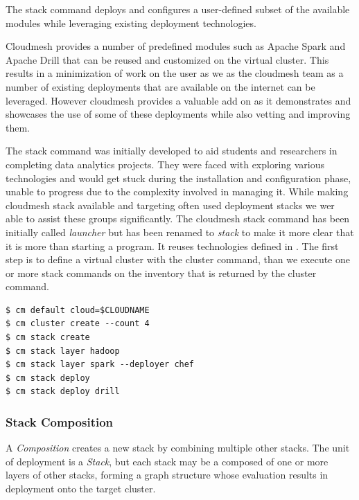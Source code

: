 The stack command deploys and configures a user-defined subset of the
available modules while leveraging existing deployment technologies.

Cloudmesh provides a number of predefined modules such as Apache Spark
and Apache Drill that can be reused and customized on the virtual
cluster. This results in a minimization of work on the user as we as
the cloudmesh team as a number of existing deployments that are
available on the internet can be leveraged. However cloudmesh provides
a valuable add on as it demonstrates and showcases the use of some of
these deployments while also vetting and improving them.


The stack command was initially developed to aid students and
researchers in completing data analytics projects.  They were faced
with exploring various technologies and would get stuck during the
installation and configuration phase, unable to progress due to the
complexity involved in managing it. While making cloudmesh stack
available and targeting often used deployment stacks we wer able to
assist these groups significantly.  The cloudmesh stack command has
been initially called {\em launcher} but has been renamed to {\em
  stack} to make it more clear that it is more than starting a
program. It reuses technologies defined in . The first step is
to define a virtual cluster with the cluster command, than we execute
one or more stack commands on the inventory that is returned by the
cluster command.

\begin{Verbatim}[fontfamily=helvetica]
$ cm default cloud=$CLOUDNAME
$ cm cluster create --count 4
$ cm stack create
$ cm stack layer hadoop
$ cm stack layer spark --deployer chef
$ cm stack deploy
$ cm stack deploy drill
\end{Verbatim}


\subsubsection{Stack Composition} \label{S:composition}

A \emph{Composition} creates a new stack by combining multiple other
stacks.  The unit of deployment is a \emph{Stack}, but each stack may
be a composed of one or more layers of other stacks, forming a graph
structure whose evaluation results in deployment onto the target
cluster.

